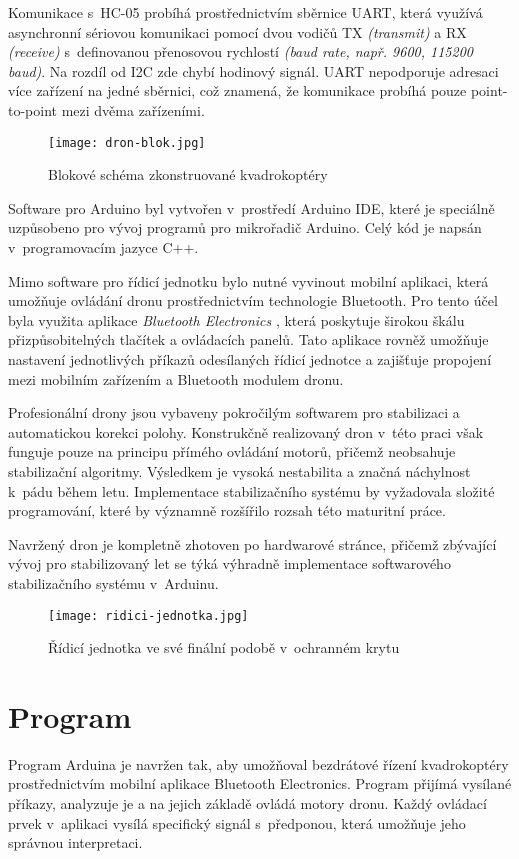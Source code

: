 \documentclass[12pt]{report}
\begin{document}
Komunikace s~HC-05 probíhá prostřednictvím sběrnice UART, která využívá asynchronní sériovou komunikaci pomocí dvou vodičů TX \textit{(transmit)} a RX \textit{(receive)} s~definovanou přenosovou rychlostí \textit{(baud rate, např. 9600, 115200 baud)}. Na rozdíl od I2C zde chybí hodinový signál. UART nepodporuje adresaci více zařízení na jedné sběrnici, což znamená, že komunikace probíhá pouze point-to-point mezi dvěma zařízeními. \cite{uart}

\begin{figure}[H]
	\centering
	\texttt{[image: dron-blok.jpg]}
	\caption{Blokové schéma zkonstruované kvadrokoptéry}
	\label{fig:dron-blok.jpg}
\end{figure}


Software pro Arduino byl vytvořen v~prostředí Arduino IDE, které je speciálně uzpůsobeno pro vývoj programů pro mikrořadič Arduino. Celý kód je napsán v~programovacím jazyce C++.

Mimo software pro řídicí jednotku bylo nutné vyvinout mobilní aplikaci, která umožňuje ovládání dronu prostřednictvím technologie Bluetooth. Pro tento účel byla využita aplikace \textit{Bluetooth Electronics} \cite{be}, která poskytuje širokou škálu přizpůsobitelných tlačítek a ovládacích panelů. Tato aplikace rovněž umožňuje nastavení jednotlivých příkazů odesílaných řídicí jednotce a zajišťuje propojení mezi mobilním zařízením a Bluetooth modulem dronu.

Profesionální drony jsou vybaveny pokročilým softwarem pro stabilizaci a automatickou korekci polohy. Konstrukčně realizovaný dron v~této praci však funguje pouze na principu přímého ovládání motorů, přičemž neobsahuje stabilizační algoritmy. Výsledkem je vysoká nestabilita a značná náchylnost k~pádu během letu. Implementace stabilizačního systému by vyžadovala složité programování, které by významně rozšířilo rozsah této maturitní práce.

Navržený dron je kompletně zhotoven po hardwarové stránce, přičemž zbývající vývoj pro stabilizovaný let se týká výhradně implementace softwarového stabilizačního systému v~Arduinu.

\begin{figure}[H]
	\centering
	\texttt{[image: ridici-jednotka.jpg]}
	\caption{Řídicí jednotka ve své finální podobě v~ochranném krytu}
	\label{fig:ridici-jednotka.jpg}
\end{figure}

\chapter[Program]{Program}
Program Arduina je navržen tak, aby umožňoval bezdrátové řízení kvadrokoptéry prostřednictvím mobilní aplikace Bluetooth Electronics. Program přijímá vysílané příkazy, analyzuje je a na jejich základě ovládá motory dronu. Každý ovládací prvek v~aplikaci vysílá specifický signál s~předponou, která umožňuje jeho správnou interpretaci.
\end{document}
